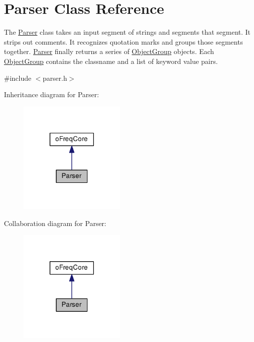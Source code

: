 \hypertarget{class_parser}{\section{Parser Class Reference}
\label{class_parser}
}


The \hyperlink{class_parser}{Parser} class takes an input segment of strings and segments that segment. It strips out comments. It recognizes quotation marks and groups those segments together. \hyperlink{class_parser}{Parser} finally returns a series of \hyperlink{class_object_group}{Object\-Group} objects. Each \hyperlink{class_object_group}{Object\-Group} contains the classname and a list of keyword value pairs.  




{\ttfamily \#include $<$parser.\-h$>$}



Inheritance diagram for Parser\-:\nopagebreak
\begin{figure}[H]
\begin{center}
\leavevmode
\includegraphics[width=146pt]{class_parser__inherit__graph}
\end{center}
\end{figure}


Collaboration diagram for Parser\-:\nopagebreak
\begin{figure}[H]
\begin{center}
\leavevmode
\includegraphics[width=146pt]{class_parser__coll__graph}
\end{center}
\end{figure}

